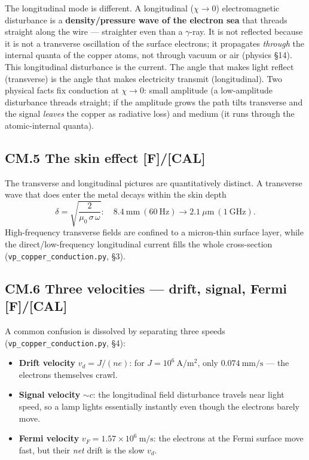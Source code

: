 \documentclass[
  10pt,
]{article}
\providecommand{\tightlist}{%
  \setlength{\itemsep}{0pt}\setlength{\parskip}{0pt}}
\begin{document}
The longitudinal mode is different. A longitudinal (\(\chi \to 0\))
electromagnetic disturbance is a \textbf{density/pressure wave of the
electron sea} that threads straight along the wire --- straighter even
than a \(\gamma\)-ray. It is not reflected because it is not a
transverse oscillation of the surface electrons; it propagates
\emph{through} the internal quanta of the copper atoms, not through
vacuum or air (physics §14). This longitudinal disturbance is the
current. The angle that makes light reflect (transverse) is the angle
that makes electricity transmit (longitudinal). Two physical facts fix
conduction at \(\chi \to 0\): small amplitude (a low-amplitude
disturbance threads straight; if the amplitude grows the path tilts
transverse and the signal \emph{leaves} the copper as radiative loss)
and medium (it runs through the atomic-internal quanta).

\hypertarget{cm.5-the-skin-effect-fcal}{%
\subsection{\texorpdfstring{CM.5 The skin effect
\textbf{{[}F{]}/{[}CAL{]}}}{CM.5 The skin effect {[}F{]}/{[}CAL{]}}}\label{cm.5-the-skin-effect-fcal}}

The transverse and longitudinal pictures are quantitatively distinct. A
transverse wave that does enter the metal decays within the skin depth
\[ \delta = \sqrt{\frac{2}{\mu_0\,\sigma\,\omega}}: \quad
   8.4\ \mathrm{mm}\ (60\ \mathrm{Hz}) \to 2.1\ \mu\mathrm{m}\ (1\ \mathrm{GHz}). \]
High-frequency transverse fields are confined to a micron-thin surface
layer, while the direct/low-frequency longitudinal current fills the
whole cross-section (\texttt{vp\_copper\_conduction.py}, §3).

\hypertarget{cm.6-three-velocities-drift-signal-fermi-fcal}{%
\subsection{\texorpdfstring{CM.6 Three velocities --- drift, signal,
Fermi
\textbf{{[}F{]}/{[}CAL{]}}}{CM.6 Three velocities --- drift, signal, Fermi {[}F{]}/{[}CAL{]}}}\label{cm.6-three-velocities-drift-signal-fermi-fcal}}

A common confusion is dissolved by separating three speeds
(\texttt{vp\_copper\_conduction.py}, §4):

\begin{itemize}
\tightlist
\item
  \textbf{Drift velocity} \(v_d = J/(ne)\): for
  \(J = 10^6\ \mathrm{A/m^2}\), only \(0.074\ \mathrm{mm/s}\) --- the
  electrons themselves crawl.
\item
  \textbf{Signal velocity} \(\sim c\): the longitudinal field
  disturbance travels near light speed, so a lamp lights essentially
  instantly even though the electrons barely move.
\item
  \textbf{Fermi velocity} \(v_F = 1.57\times 10^6\ \mathrm{m/s}\): the
  electrons at the Fermi surface move fast, but their \emph{net} drift
  is the slow \(v_d\).
\end{itemize}
\end{document}
